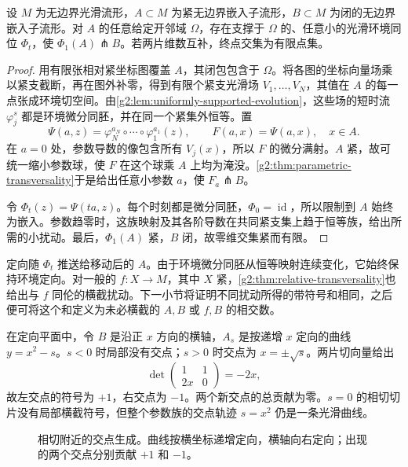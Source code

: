 \begin{proposition}\label{g2:prop:transverse-embedded-perturbation}
	设 \(M\) 为无边界光滑流形，\(A\subset M\) 为紧无边界嵌入子流形，\(B\subset M\) 为闭的无边界嵌入子流形。对 \(A\) 的任意给定开邻域 \(\Omega\)，存在支撑于 \(\Omega\) 的、任意小的光滑环境同位 \(\Phi_t\)，使 \(\Phi_1(A)\pitchfork B\)。若两片维数互补，终点交集为有限点集。
\end{proposition}
\begin{proof}
	用有限张相对紧坐标图覆盖 \(A\)，其闭包包含于 \(\Omega\)。将各图的坐标向量场乘以紧支截断，再在图外补零，得到有限个紧支光滑场 \(V_1,\ldots,V_N\)，其值在 \(A\) 的每一点张成环境切空间。由\cref{g2:lem:uniformly-supported-evolution}，这些场的短时流 \(\varphi_j^s\) 都是环境微分同胚，并在同一个紧集外恒等。置
	\[
		\Psi(a,z)=\varphi_N^{a_N}\circ\cdots\circ\varphi_1^{a_1}(z),
		\qquad F(a,x)=\Psi(a,x),\quad x\in A.
	\]
	在 \(a=0\) 处，参数导数的像包含所有 \(V_j(x)\)，所以 \(F\) 的微分满射。\(A\) 紧，故可统一缩小参数球，使 \(F\) 在这个球乘 \(A\) 上均为淹没。\cref{g2:thm:parametric-transversality}于是给出任意小参数 \(a\)，使 \(F_a\pitchfork B\)。

	令 \(\Phi_t(z)=\Psi(ta,z)\)。每个时刻都是微分同胚，\(\Phi_0=\operatorname{id}\)，所以限制到 \(A\) 始终为嵌入。参数趋零时，这族映射及其各阶导数在共同紧支集上趋于恒等族，给出所需的小扰动。最后，\(\Phi_1(A)\) 紧，\(B\) 闭，故零维交集紧而有限。
\end{proof}

定向随 \(\Phi_t\) 推送给移动后的 \(A\)。由于环境微分同胚从恒等映射连续变化，它始终保持环境定向。对一般的 \(f:X\to M\)，其中 \(X\) 紧，\cref{g2:thm:relative-transversality}也给出与 \(f\) 同伦的横截扰动。下一小节将证明不同扰动所得的带符号和相同，之后便可将这个和定义为未必横截的 \(A,B\) 或 \(f,B\) 的相交数。

\begin{example}\label{g2:exm:intersection-birth-signs}
	在定向平面中，令 \(B\) 是沿正 \(x\) 方向的横轴，\(A_s\) 是按递增 \(x\) 定向的曲线 \(y=x^2-s\)。\(s<0\) 时局部没有交点；\(s>0\) 时交点为 \(x=\pm\sqrt{s}\)。两片切向量给出
	\[
		\det\begin{pmatrix}1&1\\2x&0\end{pmatrix}=-2x,
	\]
	故左交点的符号为 \(+1\)，右交点为 \(-1\)。两个新交点的总贡献为零。\(s=0\) 的相切切片没有局部横截符号，但整个参数族的交点轨迹 \(s=x^2\) 仍是一条光滑曲线。
\end{example}

\begin{figure}[htbp]
	\centering
	
	\caption{相切附近的交点生成。曲线按横坐标递增定向，横轴向右定向；出现的两个交点分别贡献 \(+1\) 和 \(-1\)。}
	\label{g2:fig:intersection-pair}
\end{figure}

